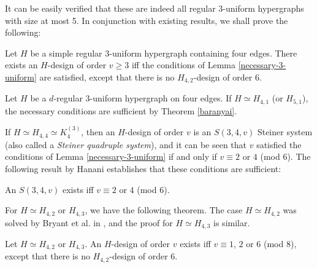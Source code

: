 It can be easily verified that these are indeed all regular $3$-uniform hypergraphs with size at most 5. %
In conjunction with existing results, we shall prove the following:

\begin{theorem} \label{thm:regular-4}
Let $H$ be a simple regular $3$-uniform hypergraph containing four edges.
There exists an $H$-design of order $v \geq 3$ iff the conditions of Lemma \ref{necessary-3-uniform} are satisfied,
  except that there is no $H_{4,2}$-design of order $6$.
\end{theorem}

Let $H$ be a $d$-regular $3$-uniform hypergraph on four edges.
If $H \simeq H_{4,1}$ (or $H_{5,1}$), the necessary conditions are sufficient by Theorem \ref{baranyai}.

If $H \simeq H_{4,4} \simeq K_4^{(3)}$, then an $H$-design of order $v$ is an $S(3, 4, v)$ Steiner system (also called a {\em Steiner quadruple system}),
  and it can be seen that $v$ satisfied the conditions of Lemma \ref{necessary-3-uniform} if and only if $v \equiv 2$ or $4$ (mod $6$).
The following result by Hanani establishes that these conditions are sufficient:

\begin{theorem} \label{thm:K4^3}
An $S(3, 4, v)$ exists iff $v \equiv 2$ or $4$ (mod $6$).
\end{theorem}


For $H \simeq H_{4,2}$ or $H_{4,3}$, we have the following theorem.
The case $H \simeq H_{4,2}$ was solved by Bryant et al. in \cite{bryant}, and the proof for $H \simeq H_{4,3}$ is similar.

\begin{theorem} \label{thm:H_42,H_43}
Let $H \simeq H_{4,2}$ or $H_{4,3}$.
An $H$-design of order $v$ exists iff $v \equiv 1$, $2$ or $6$ (mod $8$),
  except that there is no $H_{4,2}$-design of order $6$.
\end{theorem}

